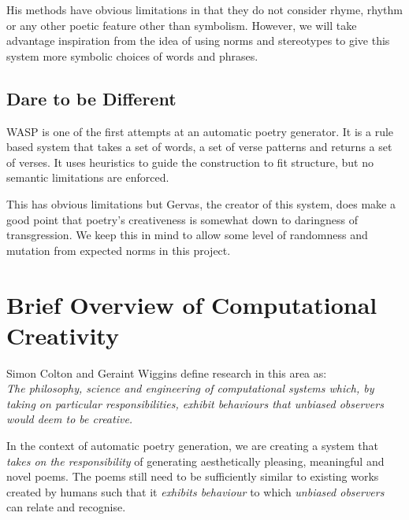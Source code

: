 His methods have obvious limitations in that they do not consider rhyme, rhythm or any other poetic feature other than symbolism. However, we will take advantage inspiration from the idea of using norms and stereotypes to give this system more symbolic choices of words and phrases.

\subsection{Dare to be Different}
WASP is one of the first attempts at an automatic poetry generator. It is a rule based system that takes a set of words, a set of verse patterns and returns a set of verses\cite{gervas2000wasp}. It uses heuristics to guide the construction to fit structure, but no semantic limitations are enforced.

This has obvious limitations but Gervas, the creator of this system, does make a good point that poetry's creativeness is somewhat down to daringness of transgression. We keep this in mind to allow some level of randomness and mutation from expected norms in this project. 


\section{Brief Overview of Computational Creativity}
Simon Colton and Geraint Wiggins define research in this area as: \\
\textit{The philosophy, science and engineering of computational systems which, by taking on particular responsibilities, exhibit behaviours that unbiased observers would deem to be creative.}\cite{colton2012computational}

In the context of automatic poetry generation, we are creating a system that \textit{takes on the responsibility} of generating aesthetically pleasing, meaningful and novel poems. The poems still need to be sufficiently similar to existing works created by humans such that it \textit{exhibits behaviour} to which \textit{unbiased observers} can relate and recognise.

